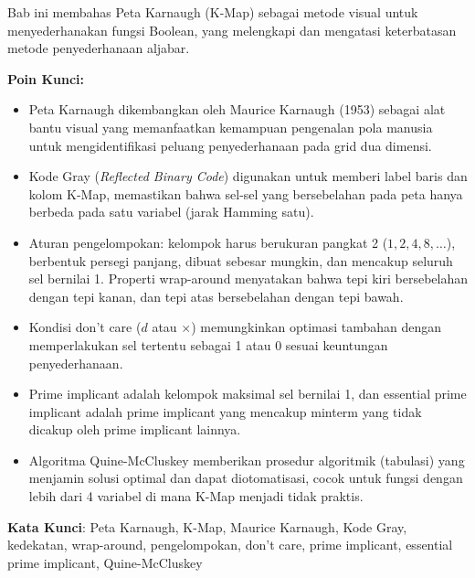 \documentclass[../main]{subfiles}
\begin{document}

\begin{rangkuman}
Bab ini membahas Peta Karnaugh (K-Map) sebagai metode visual untuk menyederhanakan fungsi Boolean, yang melengkapi dan mengatasi keterbatasan metode penyederhanaan aljabar.

\textbf{Poin Kunci:}
\begin{itemize}
  \item Peta Karnaugh dikembangkan oleh Maurice Karnaugh (1953) sebagai alat bantu visual yang memanfaatkan kemampuan pengenalan pola manusia untuk mengidentifikasi peluang penyederhanaan pada grid dua dimensi.
  \item Kode Gray (\textit{Reflected Binary Code}) digunakan untuk memberi label baris dan kolom K-Map, memastikan bahwa sel-sel yang bersebelahan pada peta hanya berbeda pada satu variabel (jarak Hamming satu).
  \item Aturan pengelompokan: kelompok harus berukuran pangkat 2 ($1, 2, 4, 8, \ldots$), berbentuk persegi panjang, dibuat sebesar mungkin, dan mencakup seluruh sel bernilai 1. Properti wrap-around menyatakan bahwa tepi kiri bersebelahan dengan tepi kanan, dan tepi atas bersebelahan dengan tepi bawah.
  \item Kondisi don't care ($d$ atau $\times$) memungkinkan optimasi tambahan dengan memperlakukan sel tertentu sebagai 1 atau 0 sesuai keuntungan penyederhanaan.
  \item Prime implicant adalah kelompok maksimal sel bernilai 1, dan essential prime implicant adalah prime implicant yang mencakup minterm yang tidak dicakup oleh prime implicant lainnya.
  \item Algoritma Quine-McCluskey memberikan prosedur algoritmik (tabulasi) yang menjamin solusi optimal dan dapat diotomatisasi, cocok untuk fungsi dengan lebih dari 4 variabel di mana K-Map menjadi tidak praktis.
\end{itemize}

\textbf{Kata Kunci}: Peta Karnaugh, K-Map, Maurice Karnaugh, Kode Gray, kedekatan, wrap-around, pengelompokan, don't care, prime implicant, essential prime implicant, Quine-McCluskey
\end{rangkuman}

\ifSubfilesClassLoaded{
  \renewcommand{\bibname}{Daftar Pustaka}
  
  
}{}
\end{document}
